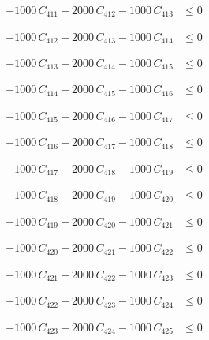 \documentclass[a4paper,11pt]{article}
\begin{document}
\begin{align}
-1000\,C_{411} + 2000\,C_{412} - 1000\,C_{413} &\leq 0 \nonumber
\end{align}

\begin{align}
-1000\,C_{412} + 2000\,C_{413} - 1000\,C_{414} &\leq 0 \nonumber
\end{align}

\begin{align}
-1000\,C_{413} + 2000\,C_{414} - 1000\,C_{415} &\leq 0 \nonumber
\end{align}

\begin{align}
-1000\,C_{414} + 2000\,C_{415} - 1000\,C_{416} &\leq 0 \nonumber
\end{align}

\begin{align}
-1000\,C_{415} + 2000\,C_{416} - 1000\,C_{417} &\leq 0 \nonumber
\end{align}

\begin{align}
-1000\,C_{416} + 2000\,C_{417} - 1000\,C_{418} &\leq 0 \nonumber
\end{align}

\begin{align}
-1000\,C_{417} + 2000\,C_{418} - 1000\,C_{419} &\leq 0 \nonumber
\end{align}

\begin{align}
-1000\,C_{418} + 2000\,C_{419} - 1000\,C_{420} &\leq 0 \nonumber
\end{align}

\begin{align}
-1000\,C_{419} + 2000\,C_{420} - 1000\,C_{421} &\leq 0 \nonumber
\end{align}

\begin{align}
-1000\,C_{420} + 2000\,C_{421} - 1000\,C_{422} &\leq 0 \nonumber
\end{align}

\begin{align}
-1000\,C_{421} + 2000\,C_{422} - 1000\,C_{423} &\leq 0 \nonumber
\end{align}

\begin{align}
-1000\,C_{422} + 2000\,C_{423} - 1000\,C_{424} &\leq 0 \nonumber
\end{align}

\begin{align}
-1000\,C_{423} + 2000\,C_{424} - 1000\,C_{425} &\leq 0 \nonumber
\end{align}
\end{document}
